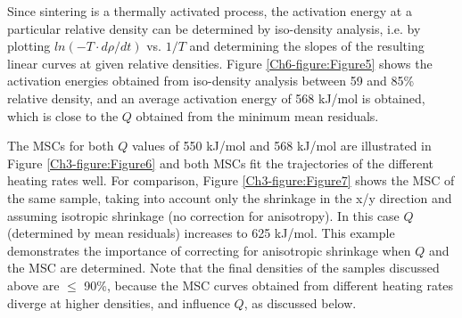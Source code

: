 Since sintering is a thermally activated process, the activation energy at a particular relative density can be determined by iso-density analysis, i.e. by plotting $ln(-T·d\rho/dt)$ vs. $1/T$ and determining the slopes of the resulting linear curves at given relative densities. Figure \ref{Ch6-figure:Figure5} shows the activation energies obtained from iso-density analysis between 59 and 85\% relative density, and an average activation energy of 568 kJ/mol is obtained, which is close to the $Q$ obtained from the minimum mean residuals. 

The MSCs for both $Q$ values of 550 kJ/mol and 568 kJ/mol are illustrated in Figure \ref{Ch3-figure:Figure6} and both MSCs fit the trajectories of the different heating rates well. For comparison, Figure \ref{Ch3-figure:Figure7} shows the MSC of the same sample, taking into account only the shrinkage in the x/y direction and assuming isotropic shrinkage (no correction for anisotropy). In this case $Q$ (determined by mean residuals) increases to 625 kJ/mol. This example demonstrates the importance of correcting for anisotropic shrinkage when $Q$ and the MSC are determined. Note that the final densities of the samples discussed above are $\leq$ 90\%, because the MSC curves obtained from different heating rates diverge at higher densities, and influence $Q$, as discussed below.

